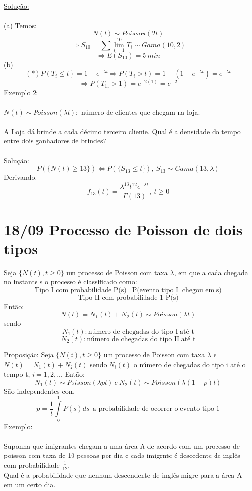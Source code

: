 \documentclass[a4paper,12pt]{article}
\begin{document}
\\
\underline{Solução:}
\\
\\
(a) Temos:
$$N(t)\sim Poisson(2t)$$
$$\Rightarrow S_{10}=\sum\lim\limits_{i=1}^{10}T_i\sim Gama(10,2)$$
$$\Rightarrow E(S_{10})=5\ min $$
(b)
$$(*)P(T_i\le t)=1-e^{-\lambda t} \Rightarrow P(T_i>t)=1-(1-e^{-\lambda t})=e^{-\lambda t}$$
  $$\Rightarrow P(T_{11}>1)=e^{-2(1)}=e^{-2}$$
  \newpage
  \underline{Exemplo 2:}\\
  \\
  $N(t)\sim Poisson(\lambda t):$ número de clientes que chegam na loja.\\
  \\
  A Loja dá brinde a cada décimo terceiro cliente. Qual é a densidade do tempo entre dois ganhadores de brindes?\\
  \\
  
 \underline{Solução:}\\
 $$P(\{N(t)\ge 13\})\iff P(\{S_{13}\le t\}),\ S_{13}\sim Gama(13,\lambda)
 $$
 Derivando,
 $$f_{13}(t)=\frac{\lambda^{13}t^{12}e^{-\lambda t}}{\Gamma(13)},\ t\ge 0
 $$
 \newpage
 \section*{18/09 Processo de Poisson de dois tipos}
 Seja  $\{N(t),t\ge0\}$ um processo de Poisson com taxa $\lambda$, em que a cada chegada no instante \underline{\underline{s}} o processo \'e classificado como:\\
 $$\text{Tipo I com probabilidade P(s)=P(evento tipo I |chegou em s)}
 $$
 $$\text{Tipo II com probabilidade 1-P(s)}
 $$
 Então:
 $$N(t)=N_1(t)+N_2(t)\sim Poisson(\lambda t)
 $$
 sendo
 $$ N_1(t):\text{número de chegadas do tipo I até t}$$
  $$ N_2(t):\text{número de chegadas do tipo II até t}$$
  
 \underline{Proposição:} Seja  $\{N(t),t\ge0\}$ um processo de Poisson com taxa $\lambda$ e  $N(t)=N_1(t)+N_2(t)$ sendo $N_i(t)$ o número de chegadas do tipo i até o tempo t, $i=1,2,...$ Então:
 $$N_1(t)\sim Poisson(\lambda pt)\ e \ N_2(t)\sim Poisson(\lambda(1-p)t)
 $$
 São independentes com
 $$p=\frac{1}{t}\int\limits_{0}^{1}P(s)ds\ \  \text{a probabilidade de ocorrer o evento tipo 1}
 $$
 \newpage
 \underline{Exemplo:}\\
 \\
 Suponha que imigrantes chegam a uma área A de acordo com um processo de poisson com taxa de 10 pessoas por dia e cada imigrnte é descedente de inglês com probabilidade $\frac{1}{12}$.\\
 Qual é a probabilidade que nenhum descendente de inglês migre para a área A em um certo dia.
 
\end{document}
